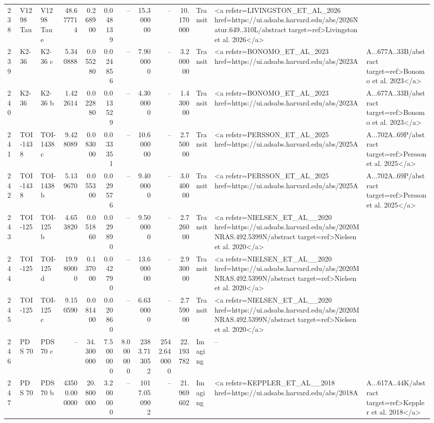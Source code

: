 \begin{tabular}{lllrrrrrrrll}
238 & V1298 Tau & V1298 Tau e & 48.677714 & 0.268900 & 0.048139 & -- & 15.300000 & -- & 10.170000 & Transit & <a refstr=LIVINGSTON_ET_AL_2026 href=https://ui.adsabs.harvard.edu/abs/2026Natur.649..310L/abstract target=ref>Livingston et al. 2026</a> \\
239 & K2-36 & K2-36 c & 5.340888 & 0.055280 & 0.024856 & -- & 7.900000 & -- & 3.200000 & Transit & <a refstr=BONOMO_ET_AL_2023 href=https://ui.adsabs.harvard.edu/abs/2023A&A...677A..33B/abstract target=ref>Bonomo et al. 2023</a> \\
240 & K2-36 & K2-36 b & 1.422614 & 0.022880 & 0.013529 & -- & 4.300000 & -- & 1.430000 & Transit & <a refstr=BONOMO_ET_AL_2023 href=https://ui.adsabs.harvard.edu/abs/2023A&A...677A..33B/abstract target=ref>Bonomo et al. 2023</a> \\
241 & TOI-1438 & TOI-1438 c & 9.428089 & 0.083000 & 0.033351 & -- & 10.600000 & -- & 2.750000 & Transit & <a refstr=PERSSON_ET_AL_2025 href=https://ui.adsabs.harvard.edu/abs/2025A&A...702A..69P/abstract target=ref>Persson et al. 2025</a> \\
242 & TOI-1438 & TOI-1438 b & 5.139670 & 0.055300 & 0.029576 & -- & 9.400000 & -- & 3.040000 & Transit & <a refstr=PERSSON_ET_AL_2025 href=https://ui.adsabs.harvard.edu/abs/2025A&A...702A..69P/abstract target=ref>Persson et al. 2025</a> \\
243 & TOI-125 & TOI-125 b & 4.653820 & 0.051860 & 0.029890 & -- & 9.500000 & -- & 2.726000 & Transit & <a refstr=NIELSEN_ET_AL__2020 href=https://ui.adsabs.harvard.edu/abs/2020MNRAS.492.5399N/abstract target=ref>Nielsen et al. 2020</a> \\
244 & TOI-125 & TOI-125 d & 19.980000 & 0.137000 & 0.042790 & -- & 13.600000 & -- & 2.930000 & Transit & <a refstr=NIELSEN_ET_AL__2020 href=https://ui.adsabs.harvard.edu/abs/2020MNRAS.492.5399N/abstract target=ref>Nielsen et al. 2020</a> \\
245 & TOI-125 & TOI-125 c & 9.150590 & 0.081400 & 0.020860 & -- & 6.630000 & -- & 2.759000 & Transit & <a refstr=NIELSEN_ET_AL__2020 href=https://ui.adsabs.harvard.edu/abs/2020MNRAS.492.5399N/abstract target=ref>Nielsen et al. 2020</a> \\
246 & PDS 70 & PDS 70 c & -- & 34.300000 & 7.500000 & 8.000000 & 2383.713052 & 2542.640000 & 22.193782 & Imaging & -- \\
247 & PDS 70 & PDS 70 b & 43500.000000 & 20.800000 & 3.200000 & -- & 1017.050902 & -- & 21.969602 & Imaging & <a refstr=KEPPLER_ET_AL__2018 href=https://ui.adsabs.harvard.edu/abs/2018A&A...617A..44K/abstract target=ref>Keppler et al. 2018</a> \\

\end{tabular}
